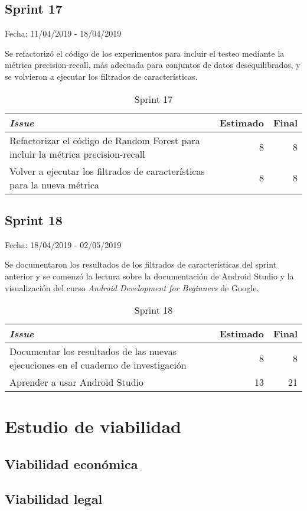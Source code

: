 \subsection{Sprint 17}

Fecha: 11/04/2019 - 18/04/2019

Se refactorizó el código de los experimentos para incluir el testeo mediante la métrica precision-recall, más adecuada para conjuntos de datos desequilibrados, y se volvieron a ejecutar los filtrados de características. 

\begin{table}[H]
	\begin{tabularx}{\textwidth}{Xrr}
		\toprule \textbf{\textit{Issue}} & \textbf{Estimado} & \textbf{Final}\\
		\toprule
		Refactorizar el código de Random Forest para incluir la métrica precision-recall & 8 & 8 \\
		Volver a ejecutar los filtrados de características para la nueva métrica & 8 & 8 \\
		\bottomrule
	\end{tabularx}
	\caption{Sprint 17}
\end{table}

\subsection{Sprint 18}

Fecha: 18/04/2019 - 02/05/2019

Se documentaron los resultados de los filtrados de características del sprint anterior y se comenzó la lectura sobre la documentación de Android Studio y la visualización del curso \textit{Android Development for Beginners} de Google.

\begin{table}[H]
	\begin{tabularx}{\textwidth}{Xrr}
		\toprule \textbf{\textit{Issue}} & \textbf{Estimado} & \textbf{Final}\\
		\toprule
		Documentar los resultados de las nuevas ejecuciones en el cuaderno de investigación & 8 & 8 \\
		Aprender a usar Android Studio & 13 & 21 \\
		\bottomrule
	\end{tabularx}
	\caption{Sprint 18}
\end{table}

\section{Estudio de viabilidad}

\subsection{Viabilidad económica}

\subsection{Viabilidad legal}


